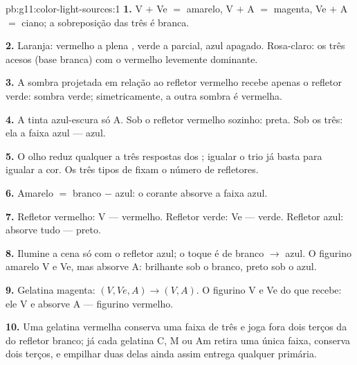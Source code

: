 \begin{solution}{pb:g11:color-light-sources:1}
\textbf{1.} V $+$ Ve $=$ amarelo, V $+$ A $=$ magenta, Ve $+$ A $=$
ciano; a sobreposição das três é branca.

\textbf{2.} Laranja: vermelho a plena , verde a  parcial,
azul apagado. Rosa-claro: os três acesos (base branca) com o vermelho
levemente dominante.

\textbf{3.} A sombra projetada em relação ao refletor vermelho recebe
apenas o refletor verde: sombra verde; simetricamente, a outra sombra é
vermelha.

\textbf{4.} A tinta azul-escura  só A. Sob o refletor vermelho
sozinho: preta. Sob os três: ela  a faixa azul --- azul.

\textbf{5.} O olho reduz qualquer  a três respostas dos ;
igualar o trio já basta para igualar a cor. Os três tipos de  fixam o
número de refletores.

\textbf{6.} Amarelo $=$ branco $-$ azul: o corante absorve a faixa azul.

\textbf{7.} Refletor vermelho:  V --- vermelho. Refletor verde:
 Ve --- verde. Refletor azul: absorve tudo --- preto.

\textbf{8.} Ilumine a cena só com o refletor azul; o toque é de branco
$\to$ azul. O figurino amarelo  V e Ve, mas absorve A: brilhante
sob o branco, preto sob o azul.

\textbf{9.} Gelatina magenta: $(V, Ve, A) \to (V, A)$. O figurino 
V e Ve do que recebe: ele  V e absorve A --- figurino vermelho.

\textbf{10.} Uma gelatina vermelha conserva uma faixa de três e joga fora
dois terços da  do refletor branco; já cada gelatina C, M ou Am
retira uma única faixa, conserva dois terços, e empilhar duas delas ainda
assim entrega qualquer primária.


\end{solution}
